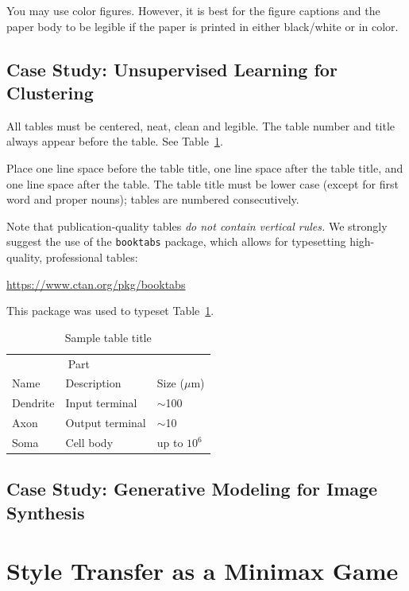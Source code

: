\documentclass{article}
\begin{document}
You may use color figures.  However, it is best for the figure
captions and the paper body to be legible if the paper is printed in
either black/white or in color.


\subsection{Case Study: Unsupervised Learning for Clustering}

All tables must be centered, neat, clean and legible.  The table
number and title always appear before the table.  See
Table~\ref{sample-table}.

Place one line space before the table title, one line space after the
table title, and one line space after the table. The table title must
be lower case (except for first word and proper nouns); tables are
numbered consecutively.

Note that publication-quality tables \emph{do not contain vertical
  rules.} We strongly suggest the use of the \verb+booktabs+ package,
which allows for typesetting high-quality, professional tables:
\begin{center}
  \url{https://www.ctan.org/pkg/booktabs}
\end{center}
This package was used to typeset Table~\ref{sample-table}.

\begin{table}
  \caption{Sample table title}
  \label{sample-table}
  \centering
  \begin{tabular}{lll}
    \toprule
    \multicolumn{2}{c}{Part}                   \\
    \cmidrule(r){1-2}
    Name     & Description     & Size ($\mu$m) \\
    \midrule
    Dendrite & Input terminal  & $\sim$100     \\
    Axon     & Output terminal & $\sim$10      \\
    Soma     & Cell body       & up to $10^6$  \\
    \bottomrule
  \end{tabular}
\end{table}


\subsection{Case Study: Generative Modeling for Image Synthesis}


\newpage


\section{Style Transfer as a Minimax Game}
\label{Sec:ST}
\end{document}
